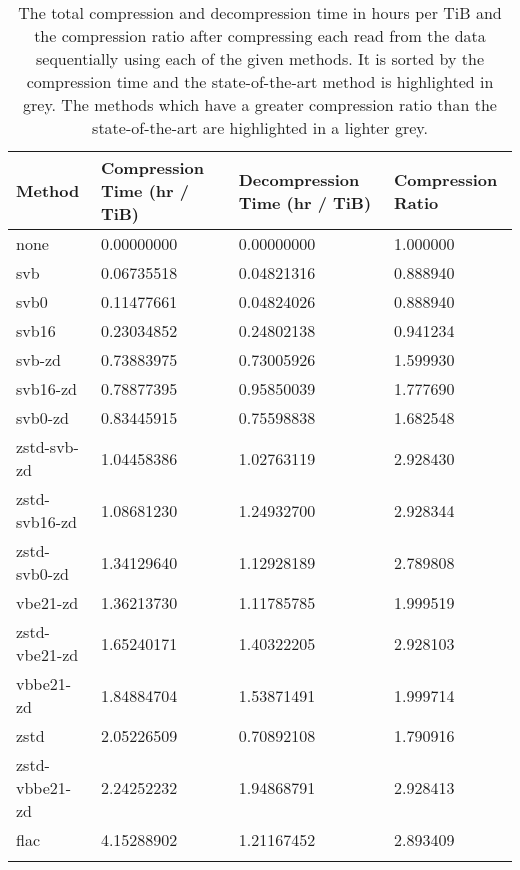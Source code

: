 \begin{table}
    \caption{\label{tab:results-time-com} The total compression and
	decompression time in hours per TiB and the compression ratio after
	compressing each read from the data sequentially using each of the given
	methods. It is sorted by the compression time and the state-of-the-art
	method is highlighted in grey. The methods which have a greater
	compression ratio than the state-of-the-art are highlighted in a lighter
	grey.}
	\begin{tabular}{|l|l|l|l|}
	    \hline
	    Method & Compression Time (hr / TiB) & Decompression Time (hr / TiB) & Compression Ratio \\
\hline
		none    & 0.00000000      & 0.00000000    &1.000000\\
                svb     & 0.06735518      & 0.04821316    &0.888940\\
               svb0     & 0.11477661      & 0.04824026    &0.888940\\
              svb16     & 0.23034852      & 0.24802138    &0.941234\\
             svb-zd     & 0.73883975      & 0.73005926    &1.599930\\
           svb16-zd     & 0.78877395      & 0.95850039    &1.777690\\
            svb0-zd     & 0.83445915      & 0.75598838    &1.682548\\
		\rowcolor{gray}
        zstd-svb-zd     & 1.04458386      & 1.02763119    &2.928430\\
      zstd-svb16-zd     & 1.08681230      & 1.24932700    &2.928344\\
       zstd-svb0-zd     & 1.34129640      & 1.12928189    &2.789808\\
           vbe21-zd     & 1.36213730      & 1.11785785    &1.999519\\
      zstd-vbe21-zd     & 1.65240171      & 1.40322205    &2.928103\\
          vbbe21-zd     & 1.84884704      & 1.53871491    &1.999714\\
               zstd     & 2.05226509      & 0.70892108    &1.790916\\
     zstd-vbbe21-zd     & 2.24252232      & 1.94868791    &2.928413\\
               flac     & 4.15288902      & 1.21167452    &2.893409\\
		\rowcolor{lightgray}

\end{tabular}
\end{table}
